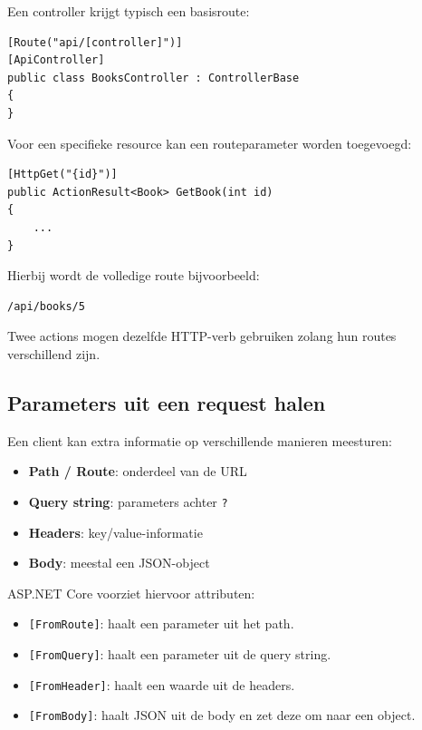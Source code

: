 Een controller krijgt typisch een basisroute:

\begin{verbatim}
[Route("api/[controller]")]
[ApiController]
public class BooksController : ControllerBase
{
}
\end{verbatim}

Voor een specifieke resource kan een routeparameter worden toegevoegd:

\begin{verbatim}
[HttpGet("{id}")]
public ActionResult<Book> GetBook(int id)
{
    ...
}
\end{verbatim}

Hierbij wordt de volledige route bijvoorbeeld:

\begin{verbatim}
/api/books/5
\end{verbatim}

Twee actions mogen dezelfde HTTP-verb gebruiken zolang hun routes verschillend zijn.

\subsection{Parameters uit een request halen}

Een client kan extra informatie op verschillende manieren meesturen:

\begin{itemize}
    \item \textbf{Path / Route}: onderdeel van de URL
    \item \textbf{Query string}: parameters achter \texttt{?}
    \item \textbf{Headers}: key/value-informatie
    \item \textbf{Body}: meestal een JSON-object
\end{itemize}

ASP.NET Core voorziet hiervoor attributen:

\begin{itemize}
    \item \texttt{[FromRoute]}: haalt een parameter uit het path.
    \item \texttt{[FromQuery]}: haalt een parameter uit de query string.
    \item \texttt{[FromHeader]}: haalt een waarde uit de headers.
    \item \texttt{[FromBody]}: haalt JSON uit de body en zet deze om naar een object.
\end{itemize}

